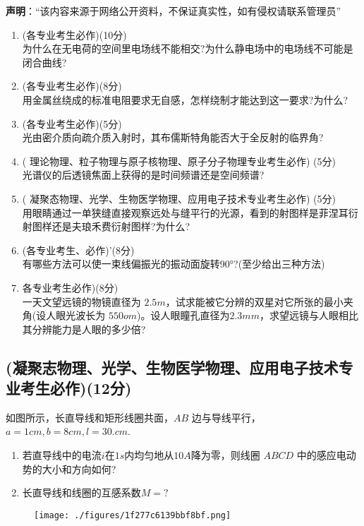 
\textbf{声明}：“该内容来源于网络公开资料，不保证真实性，如有侵权请联系管理员”

\begin{enumerate}
\item (各专业考生必作)(10分)\\
为什么在无电荷的空间里电场线不能相交?为什么静电场中的电场线不可能是闭合曲线?
\item (各专业考生必作)(8分)\\
用金属丝绕成的标准电阻要求无自感，怎样绕制才能达到这一要求?为什么?
\item (各专业考生必作)(5分)\\
光由密介质向疏介质入射时，其布儒斯特角能否大于全反射的临界角?
\item ( 理论物理、粒子物理与原子核物理、原子分子物理专业考生必作)
(5分)\\
光谱仪的后透镜焦面上获得的是时间频谱还是空间频谱?
\item ( 凝聚态物理、光学、生物医学物理、应用电子技术专业考生必作)
(5分)\\
用眼睛通过一单狭缝直接观察远处与缝平行的光源，看到的射图样是菲涅耳衍射图样还是夫琅禾费衍射图样?为什么?
\item (各专业考生、必作)'(8分)\\
有哪些方法可以使一束线偏振光的振动面旋转90°?(至少给出三种方法)
\item 各专业考生必作)(8分)\\
一天文望远镜的物镜直径为 $2.5m$，试求能被它分辨的双星对它所张的最小夹角(设人眼光波长为 $550om$)。设人眼瞳孔直径为$2.3mm$，求望远镜与人眼相比其分辨能力是人眼的多少倍?
\end{enumerate}
\subsection{(凝聚志物理、光学、生物医学物理、应用电子技术专业考生必作)(12分)}
如图所示，长直导线和矩形线圈共面，$AB$ 边与导线平行，$a=1cm,b=8cm,l=30.cm$.
\begin{enumerate}
\item 若直导线中的电流$i$在$1s$内均匀地从$10A$降为零，则线圈 $ABCD$ 中的感应电动势的大小和方向如何?
\item 长直导线和线圈的互感系数$M=?$
\end{enumerate}
\begin{figure}[ht]
\centering
\texttt{[image: ./figures/1f277c6139bbf8bf.png]}
\caption{} \label{fig_CD07_1}
\end{figure}
